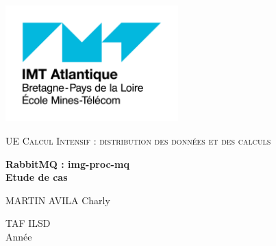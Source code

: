 \documentclass[12pt]{article}
\begin{document}
\begin{titlepage}

    \includegraphics[width=0.5\textwidth]{imt-logo.png}\par\vspace{1cm}
    \centering
	\vfill
    {\Large\textsc{UE Calcul Intensif : distribution des données et des calculs}\par}
    \vspace{3cm}
    {\huge\bfseries RabbitMQ : img-proc-mq \\
    Etude de cas\par}
    \vspace{3cm}
	\vfill
	\vfill
	\vfill
	{\Large MARTIN AVILA Charly \par}
    \vfill
    \vfill
    {\large TAF ILSD \\ Année \the\year \par}
    
\end{titlepage}
\end{document}
